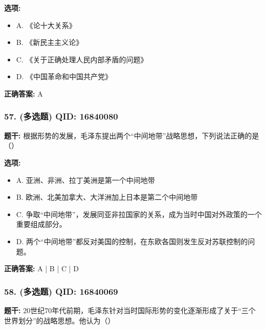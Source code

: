 \documentclass[12pt,UTF8]{ctexart}
\begin{document}
\textbf{选项:}
\begin{itemize}[leftmargin=*]

  \item A. 《论十大关系》

  \item B. 《新民主主义论》

  \item C. 《关于正确处理人民内部矛盾的问题》

  \item D. 《中国革命和中国共产党》

\end{itemize}

\textbf{正确答案:}
A

\vspace{0.3em}\hrulefill\vspace{0.7em}

\subsubsection*{57. (多选题) \small QID: 16840080}

\textbf{题干:}
根据形势的发展，毛泽东提出两个“中间地带”战略思想，下列说法正确的是（）

\textbf{选项:}
\begin{itemize}[leftmargin=*]

  \item A. 亚洲、非洲、拉丁美洲是第一个中间地带

  \item B. 欧洲、北美加拿大、大洋洲加上日本是第二个中间地带

  \item C. 争取“中间地带”，发展同亚非拉国家的关系，成为当时中国对外政策的一个重要组成部分。

  \item D. 两个“中间地带”都反对美国的控制，在东欧各国则发生反对苏联控制的问题。

\end{itemize}

\textbf{正确答案:}
A | B | C | D

\vspace{0.3em}\hrulefill\vspace{0.7em}

\subsubsection*{58. (多选题) \small QID: 16840069}

\textbf{题干:}
20世纪70年代前期，毛泽东针对当时国际形势的变化逐渐形成了关于“三个世界划分”的战略思想。他认为（）
\end{document}
